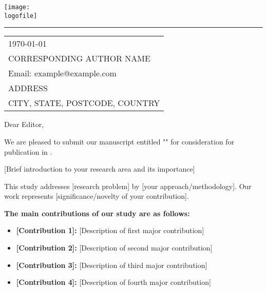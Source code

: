 \documentclass{article}
\newcommand{\logofile}{figures/logo.jpg}
\newcommand{\logowidth}{0.35\textwidth}
\begin{document}
\texttt{[image: \\logofile]}
\vspace{-1em}

\rule{\linewidth}{1pt} %

\bigskip\bigskip %

\hfill
\begin{tabular}{l}
	\hfill \today \bigskip  \\
	\hfill CORRESPONDING AUTHOR NAME \\
	\hfill Email: example@example.com     \\
	\hfill ADDRESS             \\
	\hfill CITY, STATE, POSTCODE, COUNTRY
\end{tabular}

\bigskip %


Dear Editor,

\bigskip %


We are pleased to submit our manuscript entitled "\myTitle" for consideration for publication in \journalName.

[Brief introduction to your research area and its importance]

This study addresses [research problem] by [your approach/methodology]. Our work represents [significance/novelty of your contribution].

\bigskip

\textbf{The main contributions of our study are as follows:}
\begin{itemize}
	\item \textbf{[Contribution 1]:} [Description of first major contribution]

	\item \textbf{[Contribution 2]:} [Description of second major contribution]

	\item \textbf{[Contribution 3]:} [Description of third major contribution]

	\item \textbf{[Contribution 4]:} [Description of fourth major contribution]

\end{itemize}
\end{document}
